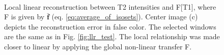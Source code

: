 \documentclass[journal]{IEEEtran}
\newcommand{\figcloser}{\vspace{-0.4cm}}
\begin{document}
\begin{figure}[t]
\centering
    \\
    \caption{{\small Local linear reconstruction between T2 intensities and F[T1], where F is given by $\mathbf{\bar{f}}$ (eq. \eqref{eq:average_of_isosets}). Center image (c) depicts the reconstruction error in false color. The selected windows are the same as in Fig. \ref{fig:llr_test}. The local relationship was made closer to linear by applying the global non-linear transfer F.}}
\label{fig:ecc_test_good}\figcloser
\end{figure}
\end{document}

